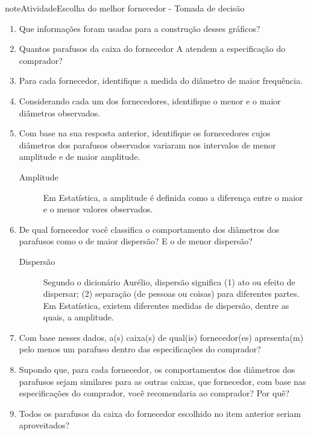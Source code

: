\begin{sphinxadmonition}{note}{Atividade}{Escolha do melhor fornecedor - Tomada de decisão}
\begin{center}
\end{center}


\begin{enumerate}
\item {} 
Que informações foram usadas para a construção desses gráficos?

\item {} 
Quantos parafusos da caixa do fornecedor A atendem a especificação do comprador?

\item {} 
Para cada fornecedor, identifique a medida do diâmetro de maior frequência.

\item {} 
Considerando cada um dos fornecedores, identifique o menor e o maior diâmetros observados.

\item {} 
Com base na sua resposta anterior, identifique os fornecedores cujos diâmetros dos parafusos observados variaram nos intervalos de menor amplitude e de maior amplitude.


\begin{description}
\item[{Amplitude}] \leavevmode{}\label{\detokenize{PE103-0:term-amplitude}}
Em Estatística, a amplitude é definida como a diferença entre o maior e o menor valores observados.

\end{description}

\item De qual fornecedor você classifica o comportamento dos diâmetros dos parafusos como o de maior    dispersão? E o de menor dispersão?
\begin{description}
\item[{Dispersão}] \leavevmode{}\label{\detokenize{PE103-0:term-dispersao}}
Segundo o dicionário Aurélio, dispersão significa (1) ato ou efeito de dispersar; (2) separação (de pessoas ou coisas) para diferentes partes.  Em Estatística, existem diferentes medidas de dispersão, dentre as quais, a amplitude.

\end{description}

\item Com base nesses dados, a(s) caixa(s) de qual(is)  fornecedor(es) apresenta(m) pelo menos um parafuso dentro das especificações do comprador?

\item Supondo que, para cada fornecedor, os comportamentos dos diâmetros dos parafusos sejam similares para as outras caixas, que fornecedor, com base nas especificações do comprador, você recomendaria ao comprador? Por quê?

\item Todos os parafusos da caixa do fornecedor escolhido no item anterior seriam aproveitados?
\end{enumerate}

\end{sphinxadmonition}



